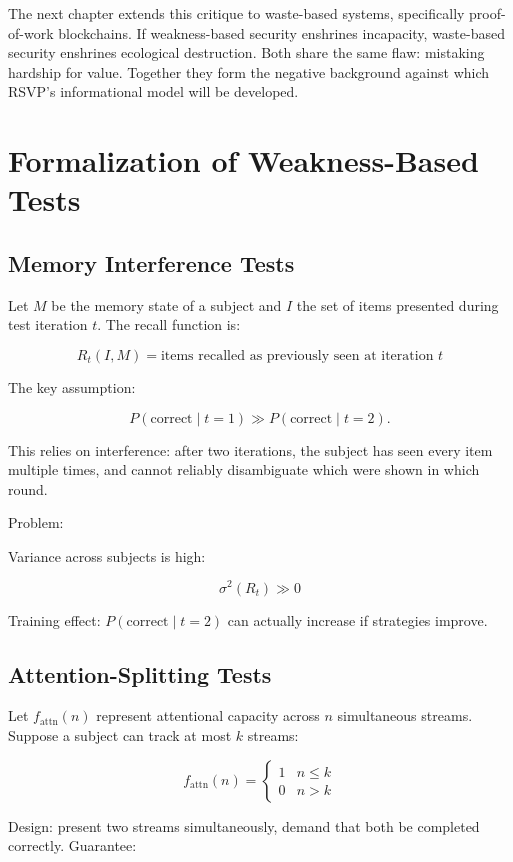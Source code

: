 \documentclass{book}
\begin{document}
The next chapter extends this critique to waste-based systems, specifically proof-of-work blockchains. If weakness-based security enshrines incapacity, waste-based security enshrines ecological destruction. Both share the same flaw: mistaking hardship for value. Together they form the negative background against which RSVP’s informational model will be developed.

\appendix
\chapter{Formalization of Weakness-Based Tests}

\section{Memory Interference Tests}

Let \( M \) be the memory state of a subject and \( I \) the set of items presented during test iteration \( t \). The recall function is:

\[ R_t(I, M) = \text{items recalled as previously seen at iteration } t \]

The key assumption:

\[ P(\text{correct} \mid t=1) \gg P(\text{correct} \mid t=2). \]

This relies on interference: after two iterations, the subject has seen every item multiple times, and cannot reliably disambiguate which were shown in which round.

Problem:

Variance across subjects is high:

\[ \sigma^2(R_t) \gg 0 \]

Training effect: \( P(\text{correct} \mid t=2) \) can actually increase if strategies improve.

\section{Attention-Splitting Tests}

Let \( f_{\text{attn}}(n) \) represent attentional capacity across \( n \) simultaneous streams. Suppose a subject can track at most \( k \) streams:

\[ f_{\text{attn}}(n) = 
\begin{cases}
1 & n \leq k \\
0 & n > k
\end{cases} \]

Design: present two streams simultaneously, demand that both be completed correctly. Guarantee:
\end{document}

